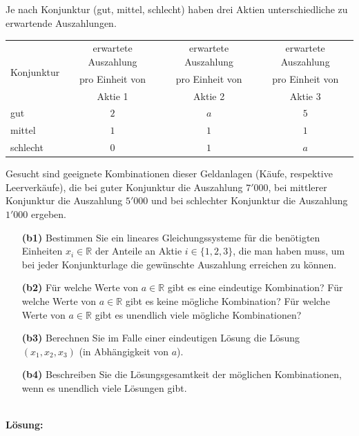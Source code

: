 \subsection*{}
Je nach Konjunktur (gut, mittel, schlecht) haben drei Aktien unterschiedliche zu erwartende Auszahlungen.
\begin{table}[H]
	\centering
	\begin{tabular}{|l |c |c |c|}
		\hline
		\multirow{3}{*}{Konjunktur}
		& erwartete Auszahlung	& erwartete Auszahlung & erwartete Auszahlung\\
		& pro Einheit von & pro Einheit von & pro Einheit von\\
		& Aktie 1 & Aktie 2	& Aktie 3\\
		\hline
		gut & $ 2 $  &  $ a $ &  $ 5 $ \\ 
		\hline
		mittel & $ 1 $ & $ 1 $ & $ 1 $  \\ 
		\hline
		schlecht & $ 0 $ & $ 1 $ & $ a $ \\
		\hline
	\end{tabular}%
\end{table}
Gesucht sind geeignete Kombinationen dieser Geldanlagen (Käufe, respektive Leerverkäufe), die bei guter Konjunktur die Auszahlung $ 7'000 $, bei mittlerer Konjunktur die Auszahlung $ 5'000 $ und bei schlechter Konjunktur die Auszahlung $ 1'000 $ ergeben.
\begin{enumerate}
	\item[\textbf{(b1)}]
	Bestimmen Sie ein lineares Gleichungssysteme für die benötigten Einheiten $ x_i \in \mathbb{R} $ der Anteile an Aktie $ i \in \{1,2,3\} $, die man haben muss, um bei jeder Konjunkturlage die gewünschte Auszahlung erreichen zu können.
	\item[\textbf{(b2)}] 
	Für welche Werte von $ a \in \mathbb{R} $ gibt es eine eindeutige Kombination?
	Für welche Werte von $ a \in \mathbb{R} $ gibt es keine mögliche Kombination?
	Für welche Werte von $ a \in \mathbb{R} $ gibt es unendlich viele mögliche Kombinationen?
	\item[\textbf{(b3)}]
	Berechnen Sie im Falle einer eindeutigen Lösung die Lösung $ (x_1,x_2,x_3) $ (in Abhängigkeit von $ a $).
	\item[\textbf{(b4)}]
	Beschreiben Sie die Lösungsgesamtkeit der möglichen Kombinationen, wenn es unendlich viele Lösungen gibt.
\end{enumerate}
\ \\
\textbf{Lösung:}
